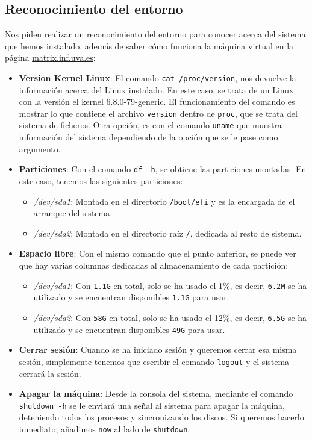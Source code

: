 \documentclass[10pt]{article}
\begin{document}
	\subsection{Reconocimiento del entorno}
	Nos piden realizar un reconocimiento del entorno para conocer acerca del sistema que hemos instalado, además de saber cómo funciona la máquina virtual en la página \url{matrix.inf.uva.es}:
	\begin{itemize}
		\item \textbf{Version Kernel Linux}: El comando \verb|cat /proc/version|, nos devuelve la información acerca del Linux instalado. En este caso, se trata de un Linux con la versión el kernel 6.8.0-79-generic. El funcionamiento del comando es mostrar lo que contiene el archivo \verb|version| dentro de \verb|proc|, que se trata del sistema de ficheros. Otra opción, es con el comando \verb|uname| que muestra información del sistema dependiendo de la opción que se le pase como argumento.
		\item \textbf{Particiones}: Con el comando \verb|df -h|, se obtiene las particiones montadas. En este caso, tenemos las siguientes particiones:
		\begin{itemize}
			\item \textit{/dev/sda1}: Montada en el directorio \verb|/boot/efi| y es la encargada de el arranque del sistema. 
			\item \textit{/dev/sda2}: Montada en el directorio raíz \verb|/|, dedicada al resto de sistema.
		\end{itemize}
		\item \textbf{Espacio libre}: Con el mismo comando que el punto anterior, se puede ver que hay varias columnas dedicadas al almacenamiento de cada partición:
		\begin{itemize}
			\item \textit{/dev/sda1}: Con \verb|1.1G| en total, solo se ha usado el 1\%, es decir, \verb|6.2M| se ha utilizado y se encuentran disponibles \verb|1.1G| para usar.
			\item \textit{/dev/sda2}: Con \verb|58G| en total, solo se ha usado el 12\%, es decir, \verb|6.5G| se ha utilizado y se encuentran disponibles \verb|49G| para usar.
		\end{itemize}
		\item \textbf{Cerrar sesión}: Cuando se ha iniciado sesión y queremos cerrar esa misma sesión, simplemente tenemos que escribir el comando \verb|logout| y el sistema cerrará la sesión.
		\item \textbf{Apagar la máquina}: Desde la consola del sistema, mediante el comando \verb|shutdown -h| se le enviará una señal al sistema para apagar la máquina, deteniendo todos los procesos y sincronizando los discos. Si queremos hacerlo inmediato, añadimos \verb|now| al lado de \verb|shutdown|.

\end{itemize}
\end{document}
